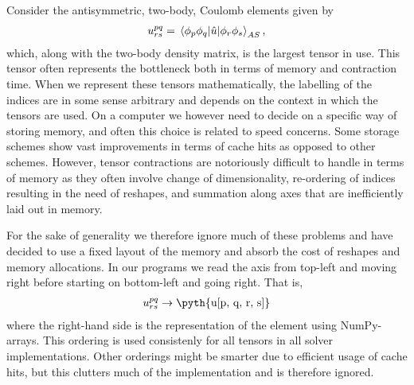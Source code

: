         Consider the antisymmetric, two-body, Coulomb elements given by
        \begin{align}
            u^{pq}_{rs}
            = \mel*{\phi_p\phi_q}{\hat{u}}{\phi_r\phi_s}_{AS},
        \end{align}
        which, along with the two-body density matrix, is the largest tensor in
        use.
        This tensor often represents the bottleneck both in terms of memory and
        contraction time.
        When we represent these tensors mathematically, the labelling of the
        indices are in some sense arbitrary and depends on the context in which
        the tensors are used.
        On a computer we however need to decide on a specific way of storing
        memory, and often this choice is related to speed concerns.
        Some storage schemes show vast improvements in terms of cache hits as
        opposed to other schemes.
        However, tensor contractions are notoriously difficult to handle in
        terms of memory as they often involve change of dimensionality,
        re-ordering of indices resulting in the need of reshapes, and summation
        along axes that are inefficiently laid out in memory.

        For the sake of generality we therefore ignore much of these problems
        and have decided to use a fixed layout of the memory and absorb the cost
        of reshapes and memory allocations.
        In our programs we read the axis from top-left and moving right before
        starting on bottom-left and going right.
        That is,
        \begin{align}
            \twoten^{pq}_{rs}
            \to \text{\pyth{u[p, q, r, s]}}
        \end{align}
        where the right-hand side is the representation of the element using
        NumPy-arrays.
        This ordering is used consistenly for all tensors in all solver
        implementations.
        Other orderings might be smarter due to efficient usage of cache hits,
        but this clutters much of the implementation and is therefore ignored.

